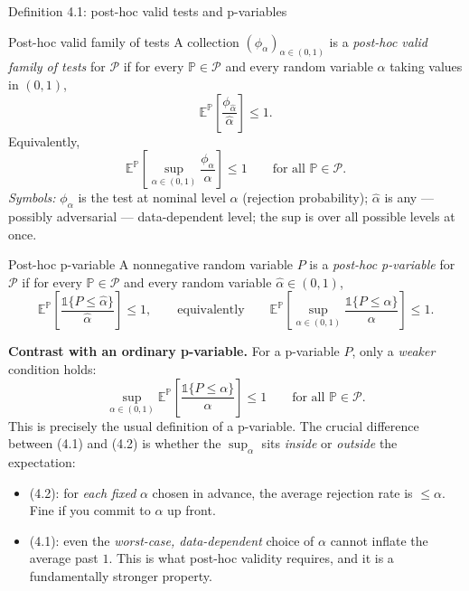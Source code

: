 \documentclass[aspectratio=169,10pt]{beamer}
\begin{document}
\begin{frame}[allowframebreaks]{Definition 4.1: post-hoc valid tests and p-variables}
  \begin{block}{Post-hoc valid family of tests}
    A collection $(\phi_\alpha)_{\alpha\in(0,1)}$ is a \emph{post-hoc valid
    family of tests} for $\mathcal P$ if for every $\mathbb P\in\mathcal P$
    and every random variable $\hat\alpha$ taking values in $(0,1)$,
    \[
      \mathbb E^{\mathbb P}\!\left[\frac{\phi_{\hat\alpha}}{\hat\alpha}\right]\le 1.
    \]
    Equivalently,
    \[
      \mathbb E^{\mathbb P}\!\left[\sup_{\alpha\in(0,1)} \frac{\phi_\alpha}{\alpha}\right]\le 1
      \qquad\text{for all }\mathbb P\in\mathcal P.
    \]
    \emph{Symbols:} $\phi_\alpha$ is the test at nominal level $\alpha$
    (rejection probability); $\hat\alpha$ is any --- possibly adversarial
    --- data-dependent level; the sup is over all possible levels at once.
  \end{block}

  \begin{block}{Post-hoc p-variable}
    A nonnegative random variable $P$ is a \emph{post-hoc p-variable} for
    $\mathcal P$ if for every $\mathbb P\in\mathcal P$ and every random
    variable $\hat\alpha\in(0,1)$,
    \[
      \mathbb E^{\mathbb P}\!\left[\frac{\mathbb 1\{P\le\hat\alpha\}}{\hat\alpha}\right]\le 1,
      \qquad\text{equivalently}\qquad
      \mathbb E^{\mathbb P}\!\left[\sup_{\alpha\in(0,1)}\frac{\mathbb 1\{P\le\alpha\}}{\alpha}\right]\le 1.
      \tag{4.1}
    \]
  \end{block}

  \framebreak

  \textbf{Contrast with an ordinary p-variable.} For a p-variable $P$, only a
  \emph{weaker} condition holds:
  \[
    \sup_{\alpha\in(0,1)} \mathbb E^{\mathbb P}\!\left[\frac{\mathbb 1\{P\le\alpha\}}{\alpha}\right]\le 1
    \qquad\text{for all }\mathbb P\in\mathcal P. \tag{4.2}
  \]
  This is precisely the usual definition of a p-variable. The crucial
  difference between (4.1) and (4.2) is whether the $\sup_\alpha$ sits
  \emph{inside} or \emph{outside} the expectation:
  \begin{itemize}
    \item (4.2): for \emph{each fixed} $\alpha$ chosen in advance, the average
    rejection rate is $\le\alpha$. Fine if you commit to $\alpha$ up front.
    \item (4.1): even the \emph{worst-case, data-dependent} choice of
    $\alpha$ cannot inflate the average past $1$. This is what post-hoc
    validity requires, and it is a fundamentally stronger property.
  \end{itemize}


\end{frame}
\end{document}
